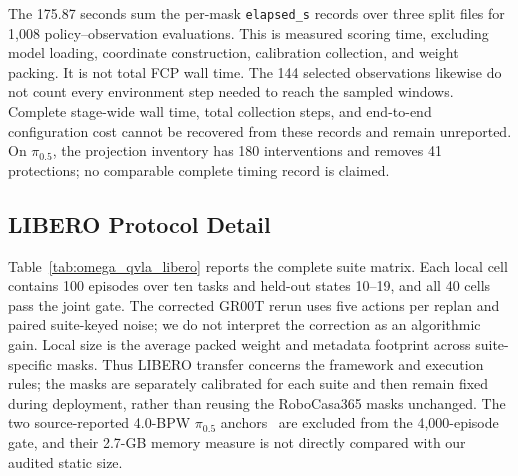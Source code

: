 The 175.87 seconds sum the per-mask \texttt{elapsed\_s} records over three split files for 1,008 policy--observation evaluations. This is measured scoring time, excluding model loading, coordinate construction, calibration collection, and weight packing. It is not total FCP wall time. The 144 selected observations likewise do not count every environment step needed to reach the sampled windows. Complete stage-wide wall time, total collection steps, and end-to-end configuration cost cannot be recovered from these records and remain unreported. On $\pi_{0.5}$, the projection inventory has 180 interventions and removes 41 protections; no comparable complete timing record is claimed.

\subsection{LIBERO Protocol Detail}
\label{sec:libero_comparison}



Table~\ref{tab:omega_qvla_libero} reports the complete suite matrix. Each local cell contains 100 episodes over ten tasks and held-out states 10--19, and all 40 cells pass the joint gate. The corrected GR00T rerun uses five actions per replan and paired suite-keyed noise; we do not interpret the correction as an algorithmic gain. Local size is the average packed weight and metadata footprint across suite-specific masks. Thus LIBERO transfer concerns the framework and execution rules; the masks are separately calibrated for each suite and then remain fixed during deployment, rather than reusing the RoboCasa365 masks unchanged. The two source-reported 4.0-BPW $\pi_{0.5}$ anchors~\citep{akbari2026actquant,xu2026qvla} are excluded from the 4,000-episode gate, and their 2.7-GB memory measure is not directly compared with our audited static size.
